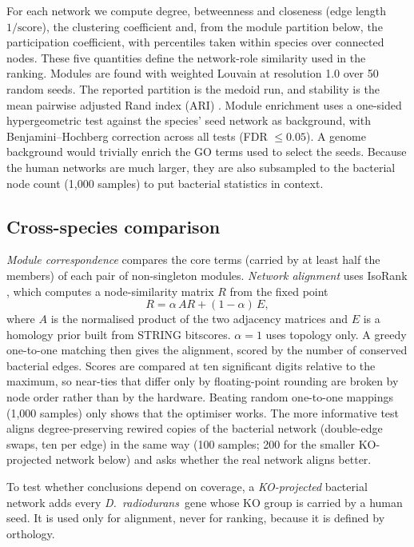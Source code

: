 \documentclass[conference]{IEEEtran}
\newcommand{\Dr}{\emph{D.~radiodurans}}
\begin{document}
For each network we compute degree, betweenness and closeness (edge length $1/\text{score}$), the
clustering coefficient and, from the module partition below, the participation coefficient, with
percentiles taken within species over connected nodes. These five quantities define the
network-role similarity used in the ranking.
Modules are found with weighted Louvain \cite{louvain} at resolution 1.0 over 50 random seeds. The
reported partition is the medoid run, and stability is the mean pairwise adjusted Rand index
(ARI) \cite{ari}. Module enrichment uses a one-sided hypergeometric test against the species'
seed network as background, with Benjamini--Hochberg correction across all tests \cite{bh}
(FDR $\leq 0.05$). A genome background would trivially enrich the GO terms used to select the
seeds. Because the human networks are much larger, they are also subsampled to the bacterial node
count (1,000 samples) to put bacterial statistics in context.

\subsection{Cross-species comparison}

\emph{Module correspondence} compares the core terms (carried by at least half the members) of
each pair of non-singleton modules. \emph{Network alignment} uses IsoRank \cite{isorank}, which
computes a node-similarity matrix $R$ from the fixed point
\begin{equation}
R = \alpha\, A R + (1 - \alpha)\, E,
\end{equation}
where $A$ is the normalised product of the two adjacency matrices and $E$ is a homology prior built
from STRING bitscores. $\alpha = 1$ uses topology only. A greedy one-to-one matching then gives the
alignment, scored by the number of conserved bacterial edges. Scores are compared at ten
significant digits relative to the maximum, so near-ties that differ only by floating-point
rounding are broken by node order rather than by the hardware. Beating random one-to-one mappings
(1,000 samples) only shows that the optimiser works. The more informative test aligns
degree-preserving rewired copies of the bacterial network (double-edge swaps, ten per edge)
\cite{maslov2002} in the same way (100 samples; 200 for the smaller KO-projected network below) and
asks whether the real network aligns better.

To test whether conclusions depend on coverage, a \emph{KO-projected} bacterial network adds every
\Dr\ gene whose KO group is carried by a human seed. It is used only for alignment, never for
ranking, because it is defined by orthology.
\end{document}
